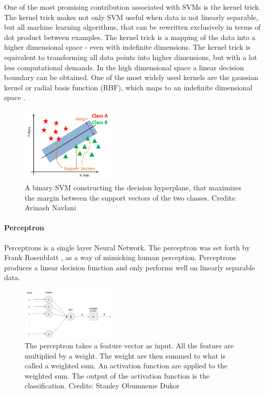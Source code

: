 One of the most promising contribution associated with SVMs is the kernel trick. The kernel trick makes not only SVM useful when data is not linearly separable, but all machine learning algorithms, that can be rewritten exclusively in terms of dot product between examples. The kernel trick is a mapping of the data into a higher dimensional space - even with indefinite dimensions. The kernel trick is equivalent to transforming all data points into higher dimensions, but with a lot less computational demands. In the high dimensional space a linear decision boundary can be obtained. One of the most widely used kernels are the gaussian kernel or radial basis function (RBF), which maps to an indefinite dimensional space \cite{Goodfellow-et-al-2016}.

\begin{figure}[H]
    \centering
    \includegraphics[width=0.4\textwidth]{figures/svm.png}
    \caption[]{A binary SVM constructing the decision hyperplane, that maximizes the margin between the support vectors of the two classes. Credits: Avinash Navlani}
    \label{fig:svm}
\end{figure}

\paragraph{Perceptron}

Perceptrons is a single layer Neural Network. The perceptron was set forth by Frank Rosenblatt \cite{Perceptron}, as a way of mimicking human perception. Perceptrons produces a linear decision function and only performs well on linearly separable data. 

\begin{figure}[H]
    \centering
    \includegraphics[width=0.4\textwidth]{figures/perceptron.png}
    \caption[]{The perceptron takes a feature vector as input. All the feature are multiplied by a weight. The weight are then summed to what is called a weighted sum. An activation function are applied to the weighted sum. The output of the activation function is the classification. Credits: Stanley Obumneme Dukor}
    \label{fig:perc}
\end{figure}

